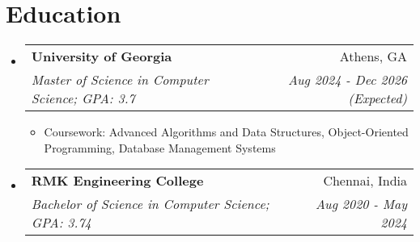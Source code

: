 \documentclass[letterpaper,10pt]{article}
\makeatletter
\newcommand{\resumeItem}[1]{
  \item\small{
    {#1 \vspace{-3pt}}
  }
}
\newcommand{\resumeSubheading}[4]{
  \vspace{-1pt}\item
    \begin{tabular*}{0.97\textwidth}{l@{\extracolsep{\fill}}r}
      \textbf{#1} & #2 \\
      \textit{\small#3} & \textit{\small #4} \\
    \end{tabular*}\vspace{-6pt}
}
\newcommand{\resumePublicationsHeading}[2]{
    \item
    \begin{tabular*}{0.97\textwidth}{l@{\extracolsep{\fill}}r}
      \small#1 & #2 \\
    \end{tabular*}\vspace{-6pt}
}
\newcommand{\resumeSubHeadingListStart}{\begin{itemize}[leftmargin=*]}
\newcommand{\resumeSubHeadingListEnd}{\end{itemize}}
\newcommand{\resumeItemListStart}{\begin{itemize}}
\newcommand{\resumeItemListEnd}{\end{itemize}\vspace{-6pt}}
\makeatother
\begin{document}
\section{Education}
  \resumeSubHeadingListStart
    \resumeSubheading
      {University of Georgia}{Athens, GA}
      {Master of Science in Computer Science; GPA: 3.7}{Aug 2024 - Dec 2026 (Expected)}
      \resumeItemListStart
    \resumeItem{Coursework: Advanced Algorithms and Data Structures, Object-Oriented Programming, Database Management Systems}
  \resumeItemListEnd
   \resumeSubheading
     {RMK Engineering College}{Chennai, India}
      {Bachelor of Science in Computer Science; GPA: 3.74}{Aug 2020 - May 2024}
  \resumeSubHeadingListEnd


\end{document}
